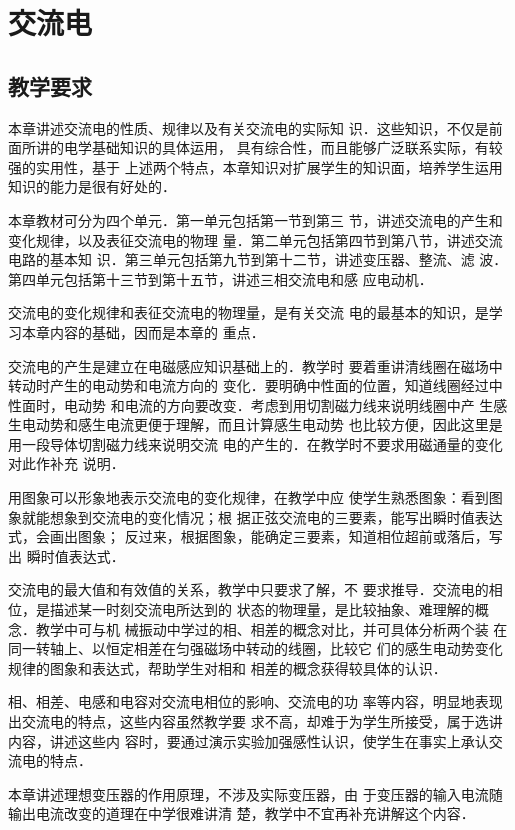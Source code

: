 \chapter{交流电}\minitoc[n]
\section{教学要求}
本章讲述交流电的性质、规律以及有关交流电的实际知
识．这些知识，不仅是前面所讲的电学基础知识的具体运用，
具有综合性，而且能够广泛联系实际，有较强的实用性，基于
上述两个特点，本章知识对扩展学生的知识面，培养学生运用
知识的能力是很有好处的．

本章教材可分为四个单元．第一单元包括第一节到第三
节，讲述交流电的产生和变化规律，以及表征交流电的物理
量．第二单元包括第四节到第八节，讲述交流电路的基本知
识．第三单元包括第九节到第十二节，讲述变压器、整流、滤
波．第四单元包括第十三节到第十五节，讲述三相交流电和感
应电动机．

交流电的变化规律和表征交流电的物理量，是有关交流
电的最基本的知识，是学习本章内容的基础，因而是本章的
重点．

交流电的产生是建立在电磁感应知识基础上的．教学时
要着重讲清线圈在磁场中转动时产生的电动势和电流方向的
变化．要明确中性面的位置，知道线圈经过中性面时，电动势
和电流的方向要改变．考虑到用切割磁力线来说明线圈中产
生感生电动势和感生电流更便于理解，而且计算感生电动势
也比较方便，因此这里是用一段导体切割磁力线来说明交流
电的产生的．在教学时不要求用磁通量的变化对此作补充
说明．

用图象可以形象地表示交流电的变化规律，在教学中应
使学生熟悉图象：看到图象就能想象到交流电的变化情况；根
据正弦交流电的三要素，能写出瞬时值表达式，会画出图象；
反过来，根据图象，能确定三要素，知道相位超前或落后，写出
瞬时值表达式．

交流电的最大值和有效值的关系，教学中只要求了解，不
要求推导．交流电的相位，是描述某一时刻交流电所达到的
状态的物理量，是比较抽象、难理解的概念．教学中可与机
械振动中学过的相、相差的概念对比，并可具体分析两个装
在同一转轴上、以恒定相差在匀强磁场中转动的线圈，比较它
们的感生电动势变化规律的图象和表达式，帮助学生对相和
相差的概念获得较具体的认识．

相、相差、电感和电容对交流电相位的影响、交流电的功
率等内容，明显地表现出交流电的特点，这些内容虽然教学要
求不高，却难于为学生所接受，属于选讲内容，讲述这些内
容时，要通过演示实验加强感性认识，使学生在事实上承认交
流电的特点．

本章讲述理想变压器的作用原理，不涉及实际变压器，由
于变压器的输入电流随输出电流改变的道理在中学很难讲清
楚，教学中不宜再补充讲解这个内容．

